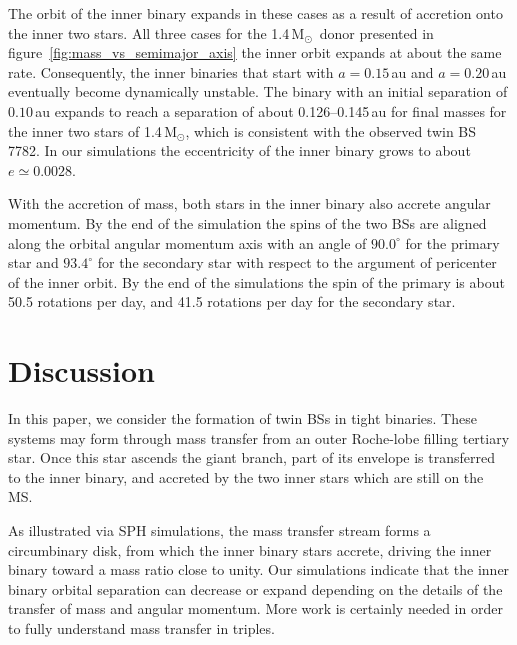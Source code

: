 \documentclass[twocolumn]{aastex62}
\newcommand{\MSun}{\mbox{M$_\odot$}}
\begin{document}
The orbit of the inner binary expands in these cases as a result of
accretion onto the inner two stars. All three cases for the
1.4\,\MSun\, donor presented in
figure~\ref{fig:mass_vs_semimajor_axis} the inner orbit expands at
about the same rate. Consequently, the inner binaries that start with
$a = 0.15$\,au and $a=0.20$\,au eventually become dynamically
unstable.  The binary with an initial separation of $0.10$\,au expands
to reach a separation of about 0.126--0.145\,au for final masses for
the inner two stars of 1.4\,\MSun, which is consistent with the
observed twin BS 7782. In our simulations the eccentricity of the
inner binary grows to about $e \simeq 0.0028$.

With the accretion of mass, both stars in the inner binary also
accrete angular momentum.  By the end of the simulation the spins of
the two BSs are aligned along the orbital angular momentum axis with
an angle of $90.0^\circ$ for the primary star and $93.4^\circ$ for the
secondary star with respect to the argument of pericenter of the inner
orbit.  By the end of the simulations the spin of the primary is about
50.5 rotations per day, and 41.5 rotations per day for the secondary
star.

\section{Discussion} \label{sect:discussion}

In this paper, we consider the formation of twin BSs in tight binaries.
These systems may form through mass transfer from an outer Roche-lobe
filling tertiary star. Once this star ascends the giant branch, part
of its envelope is transferred to the inner binary, and accreted by
the two inner stars which are still on the MS.

As illustrated via SPH simulations, the mass transfer stream forms a
circumbinary disk, from which the inner binary stars accrete, driving
the inner binary toward a mass ratio close to unity.  Our simulations
indicate that the inner binary orbital separation can decrease or
expand depending on the details of the transfer of mass and angular
momentum.  More work is certainly needed in order to fully understand 
mass transfer in triples.
\end{document}
